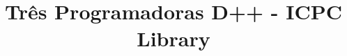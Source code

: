 \documentclass[10pt]{article}
\title{\vspace{-4ex}\Large{Três Programadoras D++ - ICPC Library}}
\author{}
\date{}
\begin{document}
\begin{landscape}
\begin{multicols}{2}

\maketitle
\vspace{-13ex}
\tableofcontents
\pagestyle{fancy}


\newpage 

\end{multicols}
\end{landscape}
\end{document}
